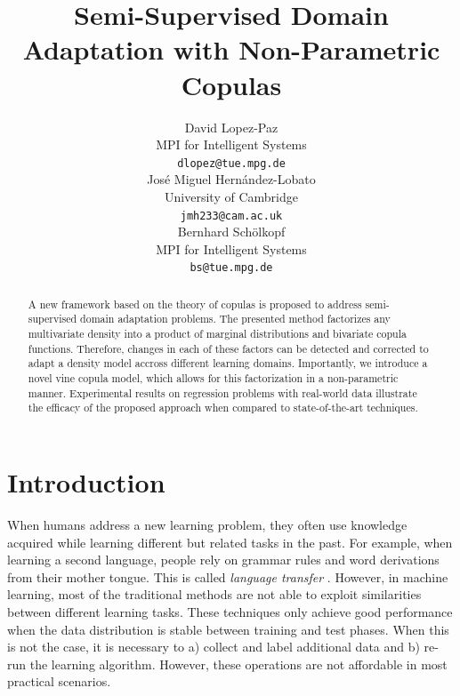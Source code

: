 \documentclass{article}
\begin{document}
\title{Semi-Supervised Domain Adaptation with Non-Parametric Copulas}

\author{
David Lopez-Paz\\
MPI for Intelligent Systems\\
\vspace{0.5cm}
\texttt{dlopez@tue.mpg.de}\\
\And
Jos\'e Miguel Hern\'andez-Lobato\\
University of Cambridge\\
\texttt{jmh233@cam.ac.uk}\\
\And
Bernhard Sch\"olkopf\\
MPI for Intelligent Systems\\
\texttt{bs@tue.mpg.de}
}

\nipsfinalcopy

\maketitle

\begin{abstract}
A new framework based on the theory of copulas is proposed to address
semi-supervised domain adaptation problems.  The presented method factorizes
any multivariate density into a product of marginal distributions and bivariate
copula functions. Therefore, changes in each of these factors can be detected
and corrected to adapt a density model accross different learning domains.
Importantly, we introduce a novel vine copula model, which allows for this
factorization in a non-parametric manner.  Experimental results on regression
problems with real-world data illustrate the efficacy of the proposed approach
when compared to state-of-the-art techniques.
\end{abstract}

\section{Introduction}

When humans address a new learning problem, they often use knowledge acquired
while learning different but related tasks in the past.  For example, when
  learning a second language, people rely on grammar rules and word derivations
  from their mother tongue.  This is called \emph{language transfer}
  \cite{language_transfer}. However, in machine learning, most of the
  traditional methods are not able to exploit similarities between different
  learning tasks. These techniques only achieve good performance when the data
  distribution is stable between training and test phases. When this is not the
  case, it is necessary to a) collect and label additional data and b) re-run
  the learning algorithm.  However, these operations are not affordable in most
  practical scenarios.
\end{document}
